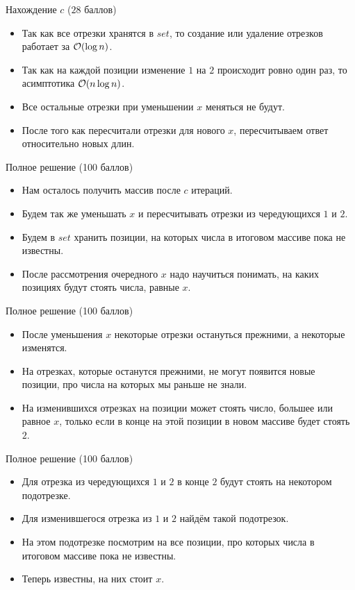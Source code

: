 \begin{frame}{Нахождение $c$ ($28$ баллов)}
  \begin{itemize}
  \item Так как все отрезки хранятся в $set$, то создание или удаление отрезков работает за $\mathcal{O}(\log n)$.
  \item Так как на каждой позиции изменение $1$ на $2$ происходит ровно один раз, то асимптотика $\mathcal{O}(n \log n)$.
  \item Все остальные отрезки при уменьшении $x$ меняться не будут.
  \item После того как пересчитали отрезки для нового $x$, пересчитываем ответ относительно новых длин.
  \end{itemize} 
\end{frame}

\begin{frame}{Полное решение (100 баллов)}
  \begin{itemize}
  \item Нам осталось получить массив после $c$ итераций.
  \item Будем так же уменьшать $x$ и пересчитывать отрезки из чередующихся $1$ и $2$.
  \item Будем в $set$ хранить позиции, на которых числа в итоговом массиве пока не известны.
  \item После рассмотрения очередного $x$ надо научиться понимать, на каких позициях будут стоять числа, равные $x$.
  \end{itemize}
\end{frame}

\begin{frame}{Полное решение (100 баллов)}
  \begin{itemize}
  \item После уменьшения $x$ некоторые отрезки остануться прежними, а некоторые изменятся.
  \item На отрезках, которые останутся прежними, не могут появится новые позиции, про числа на которых мы раньше не знали.
  \item На изменившихся отрезках на позиции может стоять число, большее или равное $x$, только если в конце на этой позиции в новом массиве будет стоять $2$.
  \end{itemize}
\end{frame}

\begin{frame}{Полное решение (100 баллов)}
  \begin{itemize}
  \item Для отрезка из чередующихся $1$ и $2$ в конце $2$ будут стоять на некотором подотрезке.
  \item Для изменившегося отрезка из $1$ и $2$ найдём такой подотрезок.
  \item На этом подотрезке посмотрим на все позиции, про которых числа в итоговом массиве пока не известны.
  \item Теперь известны, на них стоит $x$.
  \end{itemize}
\end{frame}

